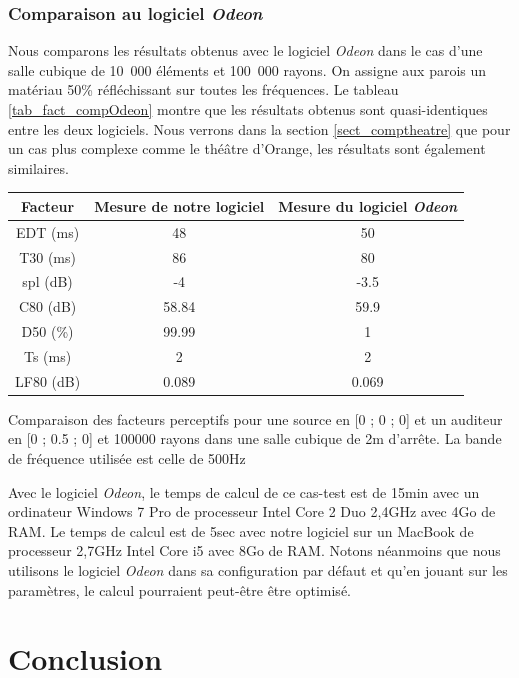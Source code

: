 \subsection{Comparaison au logiciel \textit{Odeon}} \label{sect_val_odeon}
Nous comparons les résultats obtenus avec le logiciel \textit{Odeon} dans le cas d'une salle cubique de 10~000 éléments et 100~000 rayons. On assigne aux parois un matériau 50\% réfléchissant sur toutes les fréquences. Le tableau \ref{tab_fact_compOdeon} montre que les résultats obtenus sont quasi-identiques entre les deux logiciels. Nous verrons dans la section \ref{sect_comptheatre} que pour un cas plus complexe comme le théâtre d'Orange, les résultats sont également similaires.
\begin{tableth} 
 \begin{tabular}{| *{3}{c|}} 
 \hline 
 Facteur & Mesure de notre logiciel & Mesure du logiciel \textit{Odeon} \\ 
 \hline 
 \hline 
\gls{EDT} (ms)& 48& 50 \\ 
 \hline 
\gls{T30} (ms)& 86& 80 \\ 
 \hline 
\gls{spl} (dB)& -4& -3.5 \\ 
 \hline 
\gls{C80} (dB)& 58.84& 59.9 \\ 
 \hline 
\gls{D50} (\%)& 99.99& 1 \\ 
 \hline 
\gls{Ts} (ms)& 2& 2 \\ 
 \hline 
\gls{LF80} (dB)& 0.089& 0.069 \\ 
 \hline 
\end{tabular} 
 \caption{Comparaison des facteurs perceptifs pour une source en [0 ; 0 ; 0] et un auditeur en [0 ; 0.5 ; 0] et 100000 rayons dans une salle cubique de 2m d'arrête. La bande de fréquence utilisée est celle de 500Hz} 
 \label{tab_fact_compOdeon} 
 \end{tableth}
 

Avec le logiciel \textit{Odeon}, le temps de calcul de ce cas-test est de 15min avec un ordinateur Windows 7 Pro de processeur Intel Core 2 Duo 2,4GHz avec 4Go de RAM. Le temps de calcul est de 5sec avec notre logiciel sur un MacBook de processeur 2,7GHz Intel Core i5 avec 8Go de RAM. Notons néanmoins que nous utilisons le logiciel \textit{Odeon} dans sa configuration par défaut et qu'en jouant sur les paramètres, le calcul pourraient peut-être être optimisé.
	
\chapter*{Conclusion}

